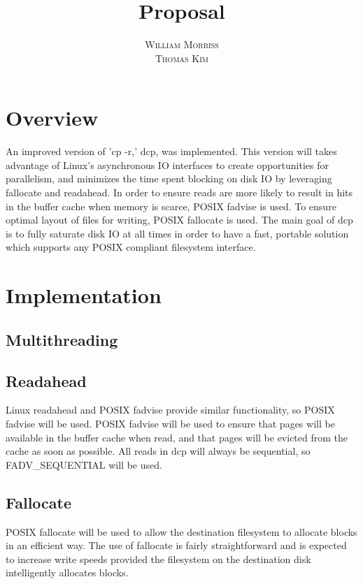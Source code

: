 \documentclass[12pt]{article}
\title{\vspace{-25mm}\fontsize{16pt}{10pt}\selectfont\textbf{Proposal}} %
\author{
  \textsc{William Morriss} \\
  \textsc{Thomas Kim}
}
\date{}
\begin{document}
\maketitle %

\section{Overview}
An improved version of 'cp -r,' dcp, was implemented.
This version will takes advantage of Linux's asynchronous IO interfaces to create
opportunities for parallelism, and minimizes the time spent blocking on disk
IO by leveraging fallocate and readahead. In order to ensure reads
are more likely to result in hits in the buffer cache when memory is scarce, POSIX
fadvise is used. To ensure optimal layout of files for writing, POSIX
fallocate is used. The main goal of dcp is to fully saturate disk IO
at all times in order to have a fast, portable solution which supports
any POSIX compliant filesystem interface.

\section{Implementation}

\subsection{Multithreading}

\subsection{Readahead}
Linux readahead and POSIX fadvise provide similar functionality,
so POSIX fadvise will be used.
POSIX fadvise will be used to ensure that pages will be available
in the buffer cache when read, and that pages will be evicted from
the cache as soon as possible. All reads in dcp will
always be sequential, so FADV\_SEQUENTIAL will be used.

\subsection{Fallocate}
POSIX fallocate will be used to allow the destination filesystem to
allocate blocks in an efficient way. The use of fallocate is
fairly straightforward and is expected to increase write speeds
provided the filesystem on the destination disk intelligently
allocates blocks.
\end{document}
